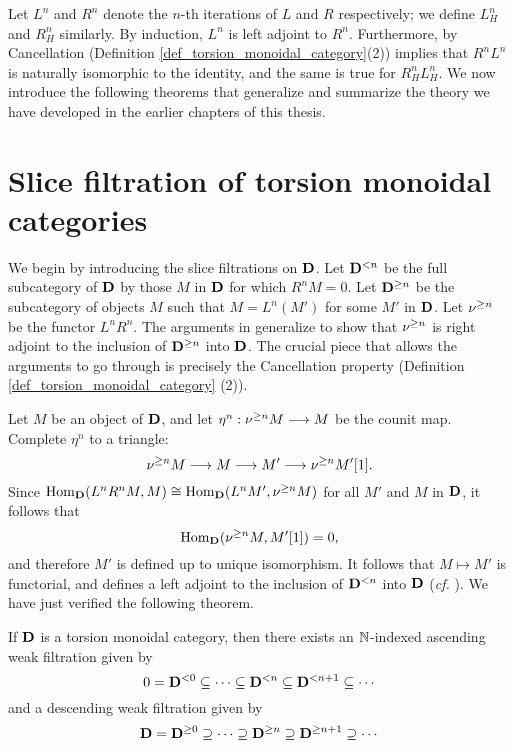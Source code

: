 Let $L^n$ and $R^n$ denote the $n$-th iterations of $L$ and $R$ 
respectively; we define $L_H^n$ and $R_H^n$ similarly. By induction,
$L^n$ is left adjoint to $R^n$. Furthermore, by Cancellation 
(Definition \ref{def_torsion_monoidal_category}(2)) implies that 
$R^nL^n$ is naturally isomorphic to the identity, and the same is 
true for $R_H^nL_H^n$. We now introduce the following theorems 
that generalize and summarize the theory we have developed in the
earlier chapters of this thesis.

\section{Slice filtration of torsion monoidal categories}
\label{sect_summary_slice_filt_on_DCat}

We begin by introducing the slice filtrations on $\mathbf{D}$. Let 
$\mathbf{D}^{< n}$ be the full subcategory of $\mathbf{D}$ by those 
$M$ in $\mathbf{D}$ for which $R^n M = 0$. Let $\mathbf{D}^{\geq n}$ be 
the subcategory of objects $M$ such that $M = L^n(M')$ for some 
$M'$ in $\mathbf{D}$. Let $\nu^{\geq n}$ be the functor  $L^nR^n$.
The arguments in \cite[1.1]{HuKa} generalize to show that 
$\nu^{\geq n}$ is right adjoint to the inclusion of 
$\mathbf{D}^{\geq n}$ into $\mathbf{D}$. The crucial piece that
allows the arguments to go through is precisely the Cancellation
property (Definition \ref{def_torsion_monoidal_category} (2)).

Let $M$ be an object of $\mathbf{D}$, and let $\eta^n : \nu^{\geq n} M 
\longrightarrow M$ be the counit map. Complete $\eta^n$ to a triangle:
\[
\nu^{\geq n} M \longrightarrow M \longrightarrow M' \longrightarrow \nu^{\geq n} M'[1].
\]
Since $\mathrm{Hom}_{\mathbf{D}}(L^nR^n M, M) \cong \mathrm{Hom}_{\mathbf{D}}(L^n M', 
\nu^{\geq n}M)$ for all $M'$ and $M$ in $\mathbf{D}$, it follows that
\[
\mathrm{Hom}_{\mathbf{D}}(\nu^{\geq n}M, M'[1]) = 0,
\]
and therefore $M'$ is defined up to unique isomorphism. It follows 
that $M \mapsto M'$ is functorial, and defines a left adjoint to 
the inclusion of $\mathbf{D}^{< n}$ into $\mathbf{D}$ (\emph{cf.} 
\cite[1.4]{HuKa}). We have just verified the following theorem.

\begin{thm}\label{thm_summary_triang_cat}
If $\mathbf{D}$ is a torsion monoidal category, then there exists
an $\mathbb{N}$-indexed ascending weak filtration given by
\[
0 = \mathbf{D}^{< 0} \subseteq \cdots \subseteq \mathbf{D}^{< n}
   \subseteq \mathbf{D}^{< n + 1} \subseteq \cdots
\]
and a descending weak filtration given by
\[
\mathbf{D} = \mathbf{D}^{\geq 0} \supseteq \cdots \supseteq \mathbf{D}^{\geq n}
\supseteq \mathbf{D}^{\geq n + 1} \supseteq \cdots
\]
\end{thm}

